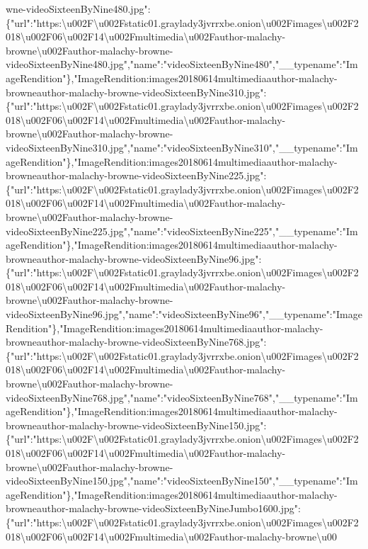 wne-videoSixteenByNine480.jpg":\{"url":"https:\textbackslash{}u002F\textbackslash{}u002Fstatic01.graylady3jvrrxbe.onion\textbackslash{}u002Fimages\textbackslash{}u002F2018\textbackslash{}u002F06\textbackslash{}u002F14\textbackslash{}u002Fmultimedia\textbackslash{}u002Fauthor-malachy-browne\textbackslash{}u002Fauthor-malachy-browne-videoSixteenByNine480.jpg","name":"videoSixteenByNine480","\_\_typename":"ImageRendition"\},"ImageRendition:images20180614multimediaauthor-malachy-browneauthor-malachy-browne-videoSixteenByNine310.jpg":\{"url":"https:\textbackslash{}u002F\textbackslash{}u002Fstatic01.graylady3jvrrxbe.onion\textbackslash{}u002Fimages\textbackslash{}u002F2018\textbackslash{}u002F06\textbackslash{}u002F14\textbackslash{}u002Fmultimedia\textbackslash{}u002Fauthor-malachy-browne\textbackslash{}u002Fauthor-malachy-browne-videoSixteenByNine310.jpg","name":"videoSixteenByNine310","\_\_typename":"ImageRendition"\},"ImageRendition:images20180614multimediaauthor-malachy-browneauthor-malachy-browne-videoSixteenByNine225.jpg":\{"url":"https:\textbackslash{}u002F\textbackslash{}u002Fstatic01.graylady3jvrrxbe.onion\textbackslash{}u002Fimages\textbackslash{}u002F2018\textbackslash{}u002F06\textbackslash{}u002F14\textbackslash{}u002Fmultimedia\textbackslash{}u002Fauthor-malachy-browne\textbackslash{}u002Fauthor-malachy-browne-videoSixteenByNine225.jpg","name":"videoSixteenByNine225","\_\_typename":"ImageRendition"\},"ImageRendition:images20180614multimediaauthor-malachy-browneauthor-malachy-browne-videoSixteenByNine96.jpg":\{"url":"https:\textbackslash{}u002F\textbackslash{}u002Fstatic01.graylady3jvrrxbe.onion\textbackslash{}u002Fimages\textbackslash{}u002F2018\textbackslash{}u002F06\textbackslash{}u002F14\textbackslash{}u002Fmultimedia\textbackslash{}u002Fauthor-malachy-browne\textbackslash{}u002Fauthor-malachy-browne-videoSixteenByNine96.jpg","name":"videoSixteenByNine96","\_\_typename":"ImageRendition"\},"ImageRendition:images20180614multimediaauthor-malachy-browneauthor-malachy-browne-videoSixteenByNine768.jpg":\{"url":"https:\textbackslash{}u002F\textbackslash{}u002Fstatic01.graylady3jvrrxbe.onion\textbackslash{}u002Fimages\textbackslash{}u002F2018\textbackslash{}u002F06\textbackslash{}u002F14\textbackslash{}u002Fmultimedia\textbackslash{}u002Fauthor-malachy-browne\textbackslash{}u002Fauthor-malachy-browne-videoSixteenByNine768.jpg","name":"videoSixteenByNine768","\_\_typename":"ImageRendition"\},"ImageRendition:images20180614multimediaauthor-malachy-browneauthor-malachy-browne-videoSixteenByNine150.jpg":\{"url":"https:\textbackslash{}u002F\textbackslash{}u002Fstatic01.graylady3jvrrxbe.onion\textbackslash{}u002Fimages\textbackslash{}u002F2018\textbackslash{}u002F06\textbackslash{}u002F14\textbackslash{}u002Fmultimedia\textbackslash{}u002Fauthor-malachy-browne\textbackslash{}u002Fauthor-malachy-browne-videoSixteenByNine150.jpg","name":"videoSixteenByNine150","\_\_typename":"ImageRendition"\},"ImageRendition:images20180614multimediaauthor-malachy-browneauthor-malachy-browne-videoSixteenByNineJumbo1600.jpg":\{"url":"https:\textbackslash{}u002F\textbackslash{}u002Fstatic01.graylady3jvrrxbe.onion\textbackslash{}u002Fimages\textbackslash{}u002F2018\textbackslash{}u002F06\textbackslash{}u002F14\textbackslash{}u002Fmultimedia\textbackslash{}u002Fauthor-malachy-browne\textbackslash{}u00